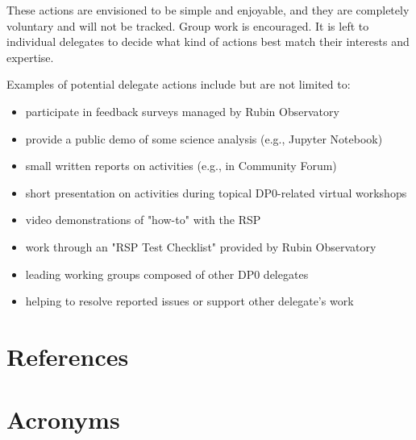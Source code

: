 \documentclass[DM,lsstdraft,authoryear,toc]{lsstdoc}
\begin{document}
These actions are envisioned to be simple and enjoyable, and they are completely voluntary and will not be tracked.
Group work is encouraged.
It is left to individual delegates to decide what kind of actions best match their interests and expertise. 

Examples of potential delegate actions include but are not limited to:
\begin{itemize}
\item participate in feedback surveys managed by Rubin Observatory
\item provide a public demo of some science analysis (e.g., Jupyter Notebook)
\item small written reports on activities (e.g., in Community Forum)
\item short presentation on activities during topical DP0-related virtual workshops
\item video demonstrations of "how-to" with the RSP
\item work through an "RSP Test Checklist" provided by Rubin Observatory
\item leading working groups composed of other DP0 delegates
\item helping to resolve reported issues or support other delegate's work
\end{itemize}


\appendix
\section{References} \label{sec:bib}
\renewcommand{\refname}{} %


\section{Acronyms}



% 
\end{document}
